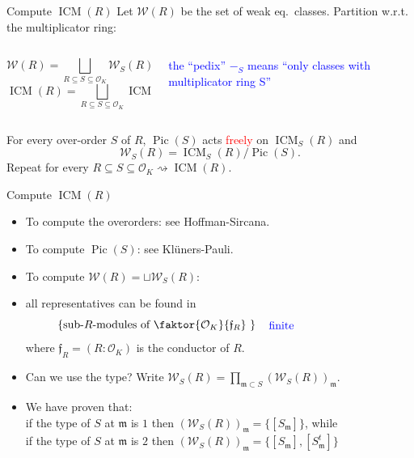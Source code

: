 \documentclass[usenames,dvipsnames]{beamer}
\DeclareMathOperator{\ICM}{ICM}
\DeclareMathOperator{\Pic}{Pic}
\newcommand{\cO}{{\mathcal O}}
\newcommand{\cW}{{\mathcal W}}
\renewcommand{\frm}{{\mathfrak m}}
\newcommand{\frf}{{\mathfrak f}}
\newcommand{\set}[1]{\left\lbrace#1\right\rbrace }
\newcommand{\red}[1]{\textcolor{red}{#1}}
\begin{document}
\begin{frame}{ Compute $\ICM(R)$ }
    Let $\cW(R)$ be the set of weak eq.~classes. 
\pause 
    Partition w.r.t. the multiplicator ring:
    \begin{columns}
    \begin{column}{0.5\textwidth}
      \[ \cW(R) = \bigsqcup_{R\subseteq S \subseteq \cO_K} \cW_S(R)\]
      \[ \ICM(R) = \bigsqcup_{R\subseteq S \subseteq \cO_K} \ICM_S(R)\]
    \end{column}
\pause
    \begin{column}{0.5\textwidth}  %
    \begin{center}
    \textcolor{blue}{\parbox{10em}{the ``pedix'' $-_S$ means ``only classes with multiplicator ring S''}} 
    \end{center}
    \end{column}
    \end{columns}
\pause
    \begin{theorem}[M.] 
    For every over-order $S$ of $R$, $\Pic(S)$ acts \red{freely} on $\ICM_S(R)$ and
    \[ \cW_S(R) = \ICM_S(R) / \Pic(S). \]
\pause
    Repeat for every $R\subseteq S \subseteq \cO_K \rightsquigarrow \ICM(R)$.
    \end{theorem}
\end{frame}

\begin{frame}{ Compute $\ICM(R)$ }
    \begin{itemize}
    \item To compute the overorders: see Hoffman-Sircana.
\pause
    \item To compute $\Pic(S)$: see Klüners-Pauli.
\pause
    \item To compute $\cW(R) = \sqcup \cW_S(R)$:
\pause
    \item all representatives can be found in
        \[\set{\text{sub-$R$-modules of $\faktor{\cO_K}{\frf_R}$ }} \quad \textcolor{blue}{\parbox{10 em}{finite}}\]
        where $\frf_R=(R:\cO_K)$ is the conductor of $R$.
\pause
    \item Can we use the type? Write $\cW_S(R) = \prod_{\frm \subset S} (\cW_S(R))_\frm$.
\pause
    \item We have proven that:\\
        if the type of $S$ at $\frm$ is $1$ then $(\cW_S(R))_\frm = \{ [S_\frm] \}$, while \\
        if the type of $S$ at $\frm$ is $2$ then $(\cW_S(R))_\frm = \{ [S_\frm], [S^t_\frm] \}$
    \end{itemize}
\end{frame}
\end{document}

